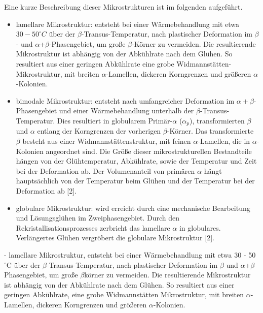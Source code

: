 Eine kurze Beschreibung dieser Mikrostrukturen ist im folgenden aufgeführt.

 
\begin{itemize}
	\item lamellare Mikrostruktur: entsteht bei einer Wärmebehandlung mit etwa $30-50 ^\circ C$ über der $\beta$-Transus-Temperatur, nach plastischer Deformation im $\beta$- und $\alpha$+$\beta$-Phasengebiet, um große $\beta$-Körner zu vermeiden. Die resultierende Mikrostruktur ist abhängig von der Abkühlrate nach dem Glühen. So resultiert aus einer geringen Abkühlrate eine grobe Widmannstätten-Mikrostruktur, mit breiten $\alpha$-Lamellen, dickeren Korngrenzen und größeren $\alpha$-Kolonien.
	\item bimodale Mikrostruktur: entsteht nach umfangreicher Deformation im $\alpha+\beta$-Phasengebiet und einer Wärmebehandlung unterhalb der $\beta$-Transus-Temperatur. Dies resultiert in globularem Primär-$\alpha$ ($\alpha_p$), transformierten $\beta$ und $\alpha$ entlang der Korngrenzen der vorherigen $\beta$-Körner. Das transformierte $\beta$ besteht aus einer Widmannstättenstruktur, mit feinen $\alpha$-Lamellen, die in $\alpha$-Kolonien angeordnet sind. Die Größe dieser mikrostrukturellen Bestandteile hängen von der Glühtemperatur, Abkühlrate, sowie der Temperatur und Zeit bei der Deformation ab. Der Volumenanteil von primären $\alpha$ hängt hauptsächlich von der Temperatur beim Glühen und der Temperatur bei der Deformation ab [2].
	\item globulare Mikrostruktur: wird erreicht durch eine mechanische Bearbeitung und Lösungsglühen im Zweiphasengebiet. Durch den Rekristallisationsprozesses zerbricht das lamellare $\alpha$ in globulares. Verlängertes Glühen vergröbert die globulare Mikrostruktur [2].
\end{itemize}
- lamellare Mikrostruktur, entsteht bei einer Wärmebehandlung mit etwa 30 - 50 $^\circ$C über der $\beta$-Transus-Temperatur, nach plastischer Deformation im $\beta$ und $\alpha$+$\beta$ Phasengebiet, um große $\beta$körner zu vermeiden. Die resultierende Mikrostruktur ist abhängig von der Abkühlrate nach dem Glühen. So resultiert aus einer geringen Abkühlrate, eine grobe Widmannstätten Mikrostruktur, mit breiten $\alpha$-Lamellen, dickeren Korngrenzen und größeren $\alpha$-Kolonien.

